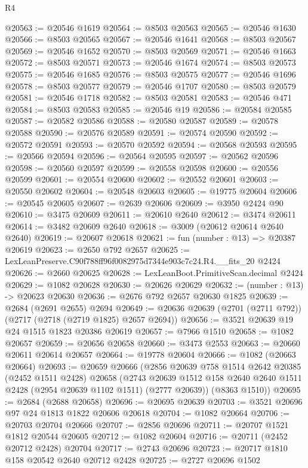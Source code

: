 \begin{lexlean}{R4}
\begin{coremodule}
@20563 := @20546 @1619
@20564 := @8503 @20563
@20565 := @20546 @1630
@20566 := @8503 @20565
@20567 := @20546 @1641
@20568 := @8503 @20567
@20569 := @20546 @1652
@20570 := @8503 @20569
@20571 := @20546 @1663
@20572 := @8503 @20571
@20573 := @20546 @1674
@20574 := @8503 @20573
@20575 := @20546 @1685
@20576 := @8503 @20575
@20577 := @20546 @1696
@20578 := @8503 @20577
@20579 := @20546 @1707
@20580 := @8503 @20579
@20581 := @20546 @1718
@20582 := @8503 @20581
@20583 := @20546 @471
@20584 := @8503 @20583
@20585 := @20546 @19
@20586 := @20584 @20585
@20587 := @20582 @20586
@20588 := @20580 @20587
@20589 := @20578 @20588
@20590 := @20576 @20589
@20591 := @20574 @20590
@20592 := @20572 @20591
@20593 := @20570 @20592
@20594 := @20568 @20593
@20595 := @20566 @20594
@20596 := @20564 @20595
@20597 := @20562 @20596
@20598 := @20560 @20597
@20599 := @20558 @20598
@20600 := @20556 @20599
@20601 := @20554 @20600
@20602 := @20552 @20601
@20603 := @20550 @20602
@20604 := @20548 @20603
@20605 := @19775 @20604
@20606 := @20545 @20605
@20607 := @2639 @20606
@20609 := @3950 @2424 @90
@20610 := @3475 @20609
@20611 := @20610 @2640
@20612 := @3474 @20611
@20614 := @3482 @20609 @2640
@20618 := @3009 (@20612 @20614 @2640 @2640)
@20619 := @20607 @20618
@20621 := fun (number : @13) => @20387 @20619
@20623 := @2650 @792 @2657
@20625 := LexLeanPreserve.C90f788ff96f0082975d7344e903c7c24.R4.__fits_20 @2424
@20626 := @2660 @20625
@20628 := LexLeanBoot.PrimitiveScan.decimal @2424
@20629 := @1082 @20628
@20630 := @20626 @20629
@20632 := (number : @13) -> @20623 @20630
@20636 := @2676 @792 @2657 @20630 @1825
@20639 := @2684 (@2691 @2655) @2694
@20649 := @20636 @20639 (@2701 (@2711 @792)) (@2717 (@2718 (@2719 @1825) @2657 @2694))
@20656 := @3521 @20639 @19 @24 @1515 @1823 @20386 @20619
@20657 := @7966 @1510
@20658 := @1082 @20657
@20659 := @20656 @20658
@20660 := @3473 @2553
@20663 := @20660 @20611 @20614 @20657
@20664 := @19778 @20604
@20666 := @1082 (@20663 @20664)
@20693 := @20659
    @20666
    (@2856
      @20639
      @758
      @1514
      @2642
      @20385
      (@2452 @1511 @2428)
      @20658
      (@2743 @20639 @1512 @158 @2640 @2640 @1511 @2428 (@2954 @20639 @1102 @1511) (@2777 @20639))
      (@8363 @1510))
@20695 := @2684 (@2688 @20658)
@20696 := @20695 @20639
@20703 := @3521 @20696 @97 @24 @1813 @1822 @20606 @20618
@20704 := @1082 @20664
@20706 := @20703 @20704 @20666
@20707 := @2856 @20696
@20711 := @20707 @1521 @1812 @20544 @20605
@20712 := @1082 @20604
@20716 := @20711 (@2452 @20712 @2428) @20704
@20717 := @2743 @20696
@20723 := @20717 @1810 @158 @20542 @2640 @20712 @2428
@20725 := @2727 @20696 @1502

\end{coremodule}
\end{lexlean}
